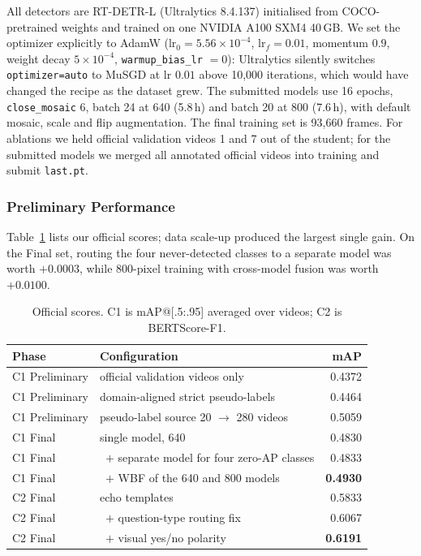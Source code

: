 All detectors are RT-DETR-L (Ultralytics 8.4.137) initialised from COCO-pretrained weights and
trained on one NVIDIA A100 SXM4 40\,GB. We set the optimizer explicitly to AdamW
($\mathrm{lr}_0 = 5.56\times10^{-4}$, $\mathrm{lr}_f = 0.01$, momentum $0.9$, weight decay
$5\times10^{-4}$, \texttt{warmup\_bias\_lr} $=0$): Ultralytics silently switches
\texttt{optimizer=auto} to MuSGD at lr $0.01$ above 10{,}000 iterations, which would have changed
the recipe as the dataset grew. The submitted models use 16 epochs,
\texttt{close\_mosaic} 6, batch 24 at 640 (5.8\,h) and batch 20 at 800 (7.6\,h), with default
mosaic, scale and flip augmentation. The final training set is 93,660 frames. For ablations we
held official validation videos 1 and 7 out of the student; for the submitted
models we merged all annotated official videos into training and submit \texttt{last.pt}.

\subsubsection{Preliminary Performance}

Table~\ref{tab:APC_TDC_results} lists our official scores; data scale-up produced the
largest single gain. On the Final set, routing the four never-detected classes to a separate
model was worth $+0.0003$, while 800-pixel training with cross-model fusion was worth
$+0.0100$.

\begin{table}[!ht]
\begin{center}
\begin{tabular}{llr}
\toprule
Phase & Configuration & mAP \\
\midrule
C1 Preliminary & official validation videos only & 0.4372 \\
C1 Preliminary & domain-aligned strict pseudo-labels & 0.4464 \\
C1 Preliminary & pseudo-label source 20 $\rightarrow$ 280 videos & 0.5059 \\
\midrule
C1 Final & single model, 640 & 0.4830 \\
C1 Final & \, $+$ separate model for four zero-AP classes & 0.4833 \\
C1 Final & \, $+$ WBF of the 640 and 800 models & \textbf{0.4930} \\
\midrule
C2 Final & echo templates & 0.5833 \\
C2 Final & \, $+$ question-type routing fix & 0.6067 \\
C2 Final & \, $+$ visual yes/no polarity & \textbf{0.6191} \\
\bottomrule
\end{tabular}
\caption{Official scores. C1 is mAP@[.5:.95] averaged over videos; C2 is BERTScore-F1.}
\label{tab:APC_TDC_results}
\end{center}
\end{table}

